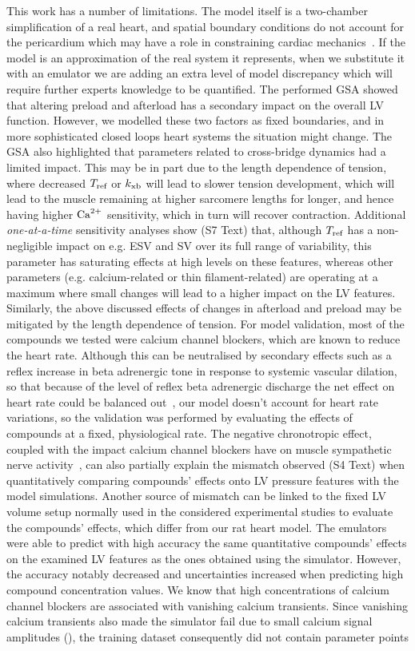 \noindent
This work has a number of limitations. The model itself is a two-chamber simplification of a real heart, and spatial boundary conditions do not account for the pericardium which may have a role in constraining cardiac mechanics~\cite{Strocchi:2020}. If the model is an approximation of the real system it represents, when we substitute it with an emulator we are adding an extra level of model discrepancy which will require further experts knowledge to be quantified. The performed GSA showed that altering preload and afterload has a secondary impact on the overall LV function. However, we modelled these two factors as fixed boundaries, and in more sophisticated closed loops heart systems the situation might change. The GSA also highlighted that parameters related to cross-bridge dynamics had a limited impact. This may be in part due to the length dependence of tension, where decreased $T_{\textrm{ref}}$ or $k_{\textrm{xb}}$ will lead to slower tension development, which will lead to the muscle remaining at higher sarcomere lengths for longer, and hence having higher $\textrm{Ca}^{2+}$ sensitivity, which in turn will recover contraction. Additional \textit{one-at-a-time} sensitivity analyses show (S7 Text) that, although $T_{\textrm{ref}}$ has a non-negligible impact on e.g. ESV and SV over its full range of variability, this parameter has saturating effects at high levels on these features, whereas other parameters (e.g. calcium-related or thin filament-related) are operating at a maximum where small changes will lead to a higher impact on the LV features. Similarly, the above discussed effects of changes in afterload and preload may be mitigated by the length dependence of tension. For model validation, most of the compounds we tested were calcium channel blockers, which are known to reduce the heart rate. Although this can be neutralised by secondary effects such as a reflex increase in beta adrenergic tone in response to systemic vascular dilation, so that because of the level of reflex beta adrenergic discharge the net effect on heart rate could be balanced out~\cite{Low:1982}, our model doesn't account for heart rate variations, so the validation was performed by evaluating the effects of compounds at a fixed, physiological rate. The negative chronotropic effect, coupled with the impact calcium channel blockers have on muscle sympathetic nerve activity~\cite{Binggeli:2002}, can also partially explain the mismatch observed (S4 Text) when quantitatively comparing compounds' effects onto LV pressure features with the model simulations. Another source of mismatch can be linked to the fixed LV volume setup normally used in the considered experimental studies to evaluate the compounds' effects, which differ from our rat heart model. The emulators were able to predict with high accuracy the same quantitative compounds' effects on the examined LV features as the ones obtained using the simulator. However, the accuracy notably decreased and uncertainties increased when predicting high compound concentration values. We know that high concentrations of calcium channel blockers are associated with vanishing calcium transients. Since vanishing calcium transients also made the simulator fail due to small calcium signal amplitudes (), the training dataset consequently did not contain parameter points 